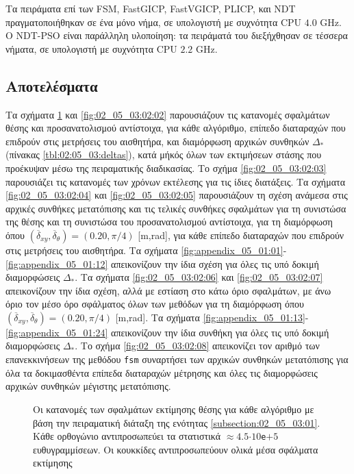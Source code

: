 Τα πειράματα επί των FSM, FastGICP, FastVGICP, PLICP, και NDT πραγματοποιήθηκαν
σε ένα μόνο νήμα, σε υπολογιστή με συχνότητα CPU $4.0$ GHz. Ο NDT-PSO είναι
παράλληλη υλοποίηση: τα πειράματά του διεξήχθησαν σε τέσσερα νήματα, σε
υπολογιστή με συχνότητα CPU $2.2$ GHz.




\subsection{Αποτελέσματα}
\label{subsection:02_05_03:02}

Τα σχήματα \ref{fig:02_05_03:02:01} και \ref{fig:02_05_03:02:02} παρουσιάζουν
τις κατανομές σφαλμάτων θέσης και προσανατολισμού αντίστοιχα, για κάθε
αλγόριθμο, επίπεδο διαταραχών που επιδρούν στις μετρήσεις του αισθητήρα, και
διαμόρφωση αρχικών συνθηκών $\Delta_\ast$ (πίνακας \ref{tbl:02:05_03:deltas}),
κατά μήκός όλων των εκτιμήσεων στάσης που προέκυψαν μέσω της πειραματικής
διαδικασίας. Το σχήμα \ref{fig:02_05_03:02:03} παρουσιάζει τις κατανομές των
χρόνων εκτέλεσης για τις ίδιες διατάξεις. Τα σχήματα \ref{fig:02_05_03:02:04}
και \ref{fig:02_05_03:02:05} παρουσιάζουν τη σχέση ανάμεσα στις αρχικές
συνθήκες μετατόπισης και τις τελικές συνθήκες σφαλμάτων για τη συνιστώσα της
θέσης και τη συνιστώσα του προσανατολισμού αντίστοιχα, για τη διαμόρφωση όπου
$(\overline{\delta}_{xy}, \overline{\delta}_{\theta}) = (0.20, \pi/4)$ [m,rad],
για κάθε επίπεδο διαταραχών που επιδρούν στις μετρήσεις του αισθητήρα.  Τα
σχήματα \ref{fig:appendix_05_01:01}-\ref{fig:appendix_05_01:12} απεικονίζουν
την ίδια σχέση για όλες τις υπό δοκιμή διαμορφώσεις $\Delta_\ast$.  Τα σχήματα
\ref{fig:02_05_03:02:06} και \ref{fig:02_05_03:02:07} απεικονίζουν την ίδια
σχέση, αλλά με εστίαση στο κάτω όριο σφαλμάτων, με άνω όριο τον μέσο όρο
σφάλματος όλων των μεθόδων για τη διαμόρφωση όπου $(\overline{\delta}_{xy},
\overline{\delta}_{\theta}) = (0.20, \pi/4)$ [m,rad]. Τα σχήματα
\ref{fig:appendix_05_01:13}-\ref{fig:appendix_05_01:24} απεικονίζουν την ίδια
συνθήκη για όλες τις υπό δοκιμή διαμορφώσεις $\Delta_*$. Το σχήμα
\ref{fig:02_05_03:02:08} απεικονίζει τον αριθμό των επανεκκινήσεων της μεθόδου
\texttt{fsm} συναρτήσει των αρχικών συνθηκών μετατόπισης για όλα τα
δοκιμασθέντα επίπεδα διαταραχών μέτρησης και όλες τις διαμορφώσεις αρχικών
συνθηκών μέγιστης μετατόπισης.

\begin{figure}\vspace{1cm}\hspace{0.5cm}
  
  \vspace{-4cm}
  \caption{\small Οι κατανομές των σφαλμάτων εκτίμησης θέσης για κάθε αλγόριθμο
           με βάση την πειραματική διάταξη της ενότητας
           \ref{subsection:02_05_03:01}. Κάθε ορθογώνιο αντιπροσωπεύει τα
           στατιστικά $\approx 4.5$$\cdot$$10$\texttt{e}$+$$5$ ευθυγραμμίσεων.
           Οι κουκκίδες αντιπροσωπεύουν ολικά μέσα σφάλματα εκτίμησης}
  \label{fig:02_05_03:02:01}
\end{figure}


